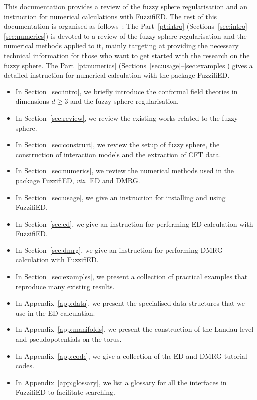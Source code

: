 \documentclass{timesjhep}
\begin{document}
This documentation provides a review of the fuzzy sphere regularisation and an instruction for numerical calculations with FuzzifiED. The rest of this documentation is organised as follows~: The Part~\ref{pt:intro} (Sections~\ref{sec:intro}--\ref{sec:numerics}) is devoted to a review of the fuzzy sphere regularisation and the numerical methods applied to it, mainly targeting at providing the necessary technical information for those who want to get started with the research on the fuzzy sphere. The Part~\ref{pt:numerics} (Sections~\ref{sec:usage}--\ref{sec:examples}) gives a detailed instruction for numerical calculation with the package FuzzifiED.
\begin{itemize}
    \item In Section~\ref{sec:intro}, we briefly introduce the conformal field theories in dimensions $d\ge 3$ and the fuzzy sphere regularisation.
    \item In Section~\ref{sec:review}, we review the existing works related to the fuzzy sphere.
    \item In Section~\ref{sec:construct}, we review the setup of fuzzy sphere, the construction of interaction models and the extraction of CFT data.
    \item In Section~\ref{sec:numerics}, we review the numerical methods used in the package FuzzifiED, \textit{viz.}~ED and DMRG.
    \item In Section~\ref{sec:usage}, we give an instruction for installing and using FuzzifiED.
    \item In Section~\ref{sec:ed}, we give an instruction for performing ED calculation with FuzzifiED.
    \item In Section~\ref{sec:dmrg}, we give an instruction for performing DMRG calculation with FuzzifiED.
    \item In Section~\ref{sec:examples}, we present a collection of practical examples that reproduce many existing results.
    \item In Appendix~\ref{app:data}, we present the specialised data structures that we use in the ED calculation.
    \item In Appendix~\ref{app:manifolds}, we present the construction of the Landau level and pseudopotentials on the torus.
    \item In Appendix~\ref{app:code}, we give a collection of the ED and DMRG tutorial codes.
    \item In Appendix~\ref{app:glossary}, we list a glossary for all the interfaces in FuzzifiED to facilitate searching.
\end{itemize}
\end{document}

